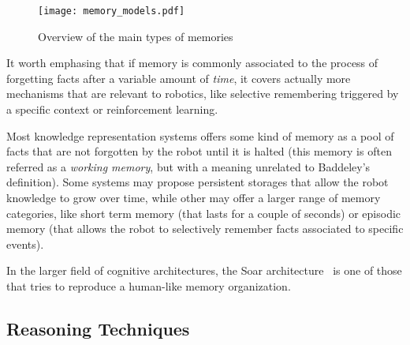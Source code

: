 \documentclass[a4paper, twocolumn]{article}
\begin{document}
\begin{figure}
    \centering
    \texttt{[image: memory\_models.pdf]}
    \caption{Overview of the main types of memories}
    \label{fig|memory_models}
\end{figure}

It worth emphasing that if memory is commonly associated to the process of
forgetting facts after a variable amount of \emph{time}, it covers actually
more mechanisms that are relevant to robotics, like selective remembering
triggered by a specific context or reinforcement learning.

Most knowledge representation systems offers some kind of memory as a pool of
facts that are not forgotten by the robot until it is halted (this memory is
often referred as a \emph{working memory}, but with a meaning unrelated to
Baddeley's definition). Some systems may propose persistent storages that allow
the robot knowledge to grow over time, while other may offer a larger range of
memory categories, like short term memory (that lasts for a couple of seconds)
or episodic memory (that allows the robot to selectively remember facts
associated to specific events).

In the larger field of cognitive architectures, the {\sc Soar}
architecture~\cite{Lehman2006} is one of those that tries to reproduce a
human-like memory organization.

\subsection{Reasoning Techniques}
\label{sect|reasoning}

\begin{scriptsize}
\begin{center}
\end{center}
\end{scriptsize}
\end{document}
